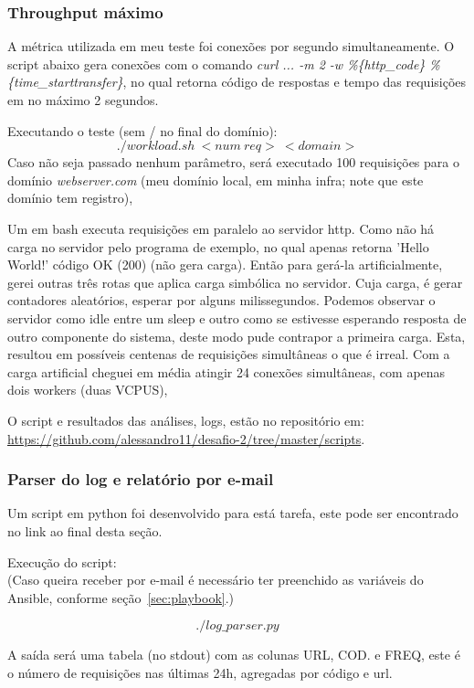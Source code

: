 \subsubsection{Throughput máximo}
A métrica utilizada em meu teste foi conexões por segundo
simultaneamente. O script abaixo gera conexões com o comando
\emph{curl ... -m 2 -w \%\{http\_code\} \%\{time\_starttransfer\}}, no
qual retorna código de respostas e tempo das requisições em no máximo
2 segundos.

Executando o teste (sem / no final do domínio):
$$./workload.sh\ <num\ req>\ <domain>$$
Caso não seja passado nenhum parâmetro, será executado 100 requisições
para o domínio \emph{webserver.com} (meu domínio local, em minha infra; note
que este domínio tem registro),

Um
\label{script:carga}
em bash executa requisições em paralelo ao servidor http. Como não há
carga no servidor pelo programa de exemplo, no qual apenas retorna
'Hello World!' código OK (200) (não gera carga). Então para gerá-la
artificialmente, gerei outras três rotas que aplica carga simbólica
no servidor. Cuja carga, é gerar contadores aleatórios, esperar por
alguns milissegundos. Podemos observar o servidor como idle entre um
sleep e outro como se estivesse esperando resposta de outro componente
do sistema, deste modo pude contrapor a primeira carga. Esta, resultou
em possíveis centenas de requisições simultâneas o que é irreal. Com a
carga artificial cheguei em média atingir 24 conexões simultâneas, com
apenas dois workers (duas VCPUS),

O script e resultados das análises, logs, estão no repositório em:\\
\href{https://github.com/alessandro11/desafio-2/tree/master/scripts}{https://github.com/alessandro11/desafio-2/tree/master/scripts}.


\subsubsection{Parser do log e relatório por e-mail}
Um script em python foi desenvolvido para está tarefa, este pode ser
encontrado no link ao final desta seção.

Execução do script:\\
(Caso queira receber por e-mail é necessário ter preenchido as
variáveis do Ansible, conforme seção~\ref{sec:playbook}.)

$$./log\_parser.py$$

A saída será uma tabela (no stdout) com as colunas URL, COD. e FREQ, este é o
número de requisições nas últimas 24h, agregadas por código e url.

